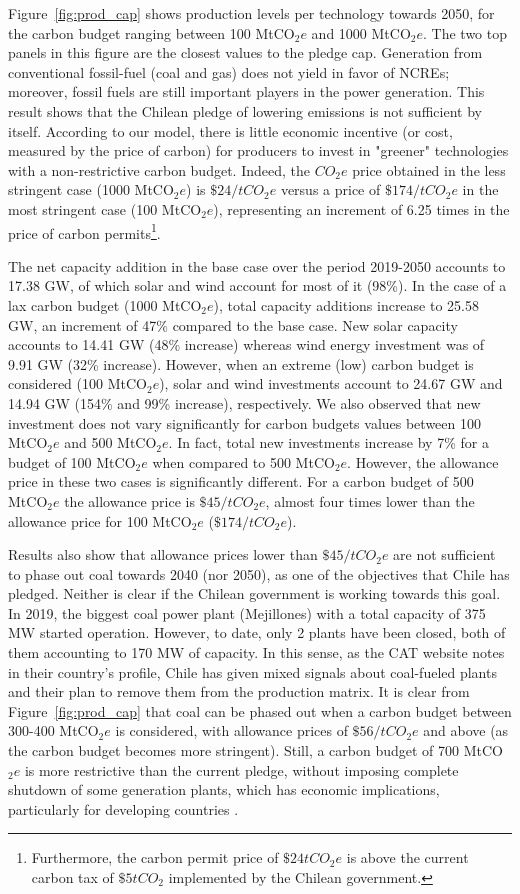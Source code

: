 \documentclass[11pt, letterpaper]{article}
\begin{document}
Figure~\ref{fig:prod_cap} shows production levels per technology towards 2050, for the carbon budget ranging between 100 MtCO$_2e$ and 1000 MtCO$_2e$. The two top panels in  this figure are the closest values to the pledge cap. Generation from conventional fossil-fuel (coal and gas) does not yield in favor of NCREs; moreover, fossil fuels are still important players in the power generation. This result shows that the Chilean pledge of lowering emissions is not sufficient by itself. According to our model, there is little economic incentive (or cost, measured by the price of carbon) for producers to invest in "greener" technologies with a non-restrictive carbon budget. Indeed, the $CO_2e$ price obtained in the less stringent case (1000 MtCO$_2e$) is $\$24/tCO_2e$ versus a price of $\$174/tCO_2e$ in the most stringent case (100 MtCO$_2e$), representing an increment of 6.25 times in the price of carbon permits\footnote{Furthermore, the carbon permit price of $\$24 tCO_2e$ is above the current carbon tax of $\$5 tCO_2$ implemented by the Chilean government.}. 
\smallskip

The net capacity addition in the base case over the period 2019-2050 accounts to 17.38 GW, of which solar and wind account for most of it (98\%). In the case of a lax carbon budget (1000 MtCO$_2e$), total capacity additions increase to 25.58 GW, an increment of 47\% compared to the base case. New solar capacity accounts to 14.41 GW (48\% increase) whereas wind energy investment was of 9.91 GW (32\% increase). However, when an extreme (low) carbon budget is considered (100 MtCO$_2e$), solar and wind investments account to 24.67 GW and 14.94 GW (154\% and 99\% increase), respectively. We also observed that new investment does not vary significantly for carbon budgets values between 100 MtCO$_2e$ and 500 MtCO$_2e$. In fact, total new investments increase by 7\% for a budget of 100 MtCO$_2e$ when compared to 500 MtCO$_2e$. However, the allowance price in these two cases is significantly different. For a carbon budget of 500 MtCO$_2e$ the allowance price is $\$45/tCO_2e$, almost four times lower than the allowance price for 100 MtCO$_2e$ ($\$174/tCO_2e$).
\smallskip

Results also show that allowance prices lower than $\$45/tCO_2e$ are not sufficient to phase out coal towards 2040 (nor 2050), as one of the objectives that Chile has pledged. Neither is clear if the Chilean government is working towards this goal. In 2019, the biggest coal power plant (Mejillones) with a total capacity of 375 MW started operation. However, to date, only 2 plants have been closed, both of them accounting to 170 MW of capacity. In this sense, as the CAT website notes in their country's profile, Chile has given mixed signals about coal-fueled plants and their plan to remove them from the production matrix. It is clear from Figure~\ref{fig:prod_cap} that coal can be phased out when a carbon budget between 300-400 MtCO$_2e$  is considered, with allowance prices of $\$56/tCO_2e$ and above (as the carbon budget becomes more stringent). Still, a carbon budget of 700 MtCO$_2e$ is more restrictive than the current pledge, without imposing complete shutdown of some generation plants, which has economic implications, particularly for developing countries \cite{Binsted2019}.
\end{document}
